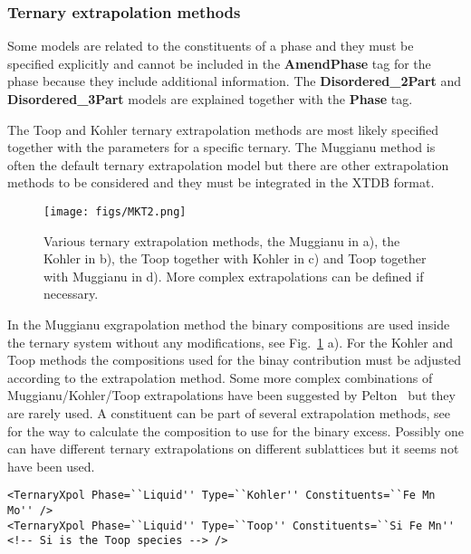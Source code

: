 \documentclass{article}
\begin{document}
\subsubsection{Ternary extrapolation methods}\label{sec:toop}

Some models are related to the constituents of a phase and they must
be specified explicitly and cannot be included in the {\bf AmendPhase}
tag for the phase because they include additional information.  The
{\bf Disordered\_2Part} and {\bf Disordered\_3Part} models are
explained together with the {\bf Phase} tag.

The Toop and Kohler ternary extrapolation methods are most likely
specified together with the parameters for a specific ternary.  The
Muggianu method is often the default ternary extrapolation model but
there are other extrapolation methods to be considered and they must
be integrated in the XTDB format.

\begin{figure}[!h]
  \texttt{[image: figs/MKT2.png]}
  \caption{Various ternary extrapolation methods, the Muggianu in a),
    the Kohler in b), the Toop together with Kohler in c) and Toop
    together with Muggianu in d).  More complex extrapolations can be
    defined if necessary.}\label{fg:MKT2}
\end{figure}

In the Muggianu exgrapolation method the binary compositions are used
inside the ternary system without any modifications, see
Fig.~\ref{fg:MKT2} a).  For the Kohler and Toop methods the
compositions used for the binay contribution must be adjusted
according to the extrapolation method.  Some more complex combinations
of Muggianu/Kohler/Toop extrapolations have been suggested by
Pelton~\cite{01Pel} but they are rarely used.  A constituent can be
part of several extrapolation methods, see~\cite{01Pel} for the way to
calculate the composition to use for the binary excess.  Possibly one
can have different ternary extrapolations on different sublattices but
it seems not have been used.

{\small
\begin{verbatim}
<TernaryXpol Phase=``Liquid'' Type=``Kohler'' Constituents=``Fe Mn Mo'' />
<TernaryXpol Phase=``Liquid'' Type=``Toop'' Constituents=``Si Fe Mn'' <!-- Si is the Toop species --> />
\end{verbatim}
}
\end{document}
